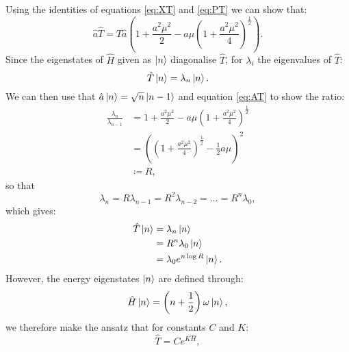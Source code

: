 \documentclass[12pt]{article}
\begin{document}
        Using the identities of equations \ref{eq:XT} and \ref{eq:PT} we can show that:
        \begin{equation}
            \label{eq:AT}
            \hat{a}\hat{T} = \hat{T}\hat{a}\left( 1 + \frac{a^2\mu^2}{2} - a\mu\left( 1 + \frac{a^2\mu^2}{4}\right)^\frac{1}{2} \right).
        \end{equation}
        Since the eigenstates of $\hat{H}$ given as $\ket{n}$ diagonalise $\hat{T}$, for $\lambda_i$ the eigenvalues of $\hat{T}$:
        \begin{equation}
            \label{eq:TEigenstates}
            \hat{T}\ket{n} = \lambda_n \ket{n}.
        \end{equation}
        We can then use that $\hat{a}\ket{n} = \sqrt{n}\ket{n-1}$ and equation \ref{eq:AT} to show the ratio:
        \begin{align}
            \label{eq:EigenRatio1} \frac{\lambda_n}{\lambda_{n-1}} & = 1 + \frac{a^2\mu^2}{2} - a\mu\left( 1 + \frac{a^2\mu^2}{4}\right)^{\frac{1}{2}} \\
            \label{eq:EigenRatio2} & = \left(\left(1+\frac{a^2\mu^2}{4}\right)^\frac{1}{2}-\frac{1}{2}a\mu\right)^{2}\\ \label{eq:R} &\coloneqq R,
        \end{align}
        so that
        \begin{equation}
            \label{eq:Lambda_N}
            \lambda_n=R\lambda_{n-1}=R^2\lambda_{n-2}=\dots=R^{n}\lambda_{0},
        \end{equation}
        which gives:
        \begin{align}
            \label{eq:TonN1} \hat{T}\ket{n} & = \lambda_n\ket{n} \\
             \label{eq:TonN2}              & = R^n\lambda_0\ket{n} \\
               \label{eq:TonN3}            & = \lambda_0 e^{n\log R}\ket{n}.
        \end{align}
        However, the energy eigenstates $\ket{n}$ are defined through:
        \begin{equation}
            \label{eq:DiscreteEnergyValues}
            \hat{H}\ket{n}=\left(n+\frac{1}{2}\right)\omega\ket{n},
        \end{equation}
        we therefore make the ansatz that for constants $C$ and $K$:
        \begin{equation}
            \label{eq:TAnsatz2}
            \hat{T}=Ce^{K\hat{H}},
        \end{equation}
\end{document}
